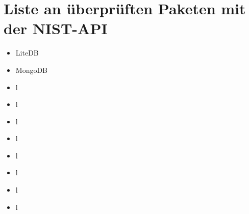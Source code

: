 \section{Liste an überprüften Paketen mit der NIST-API} \label{sec:ListOfCheckedPackages}
    \begin{itemize}
        \item LiteDB
        \item MongoDB
        \item l
        \item l
        \item l
        \item l
        \item l
        \item l
        \item l
        \item l
    \end{itemize}